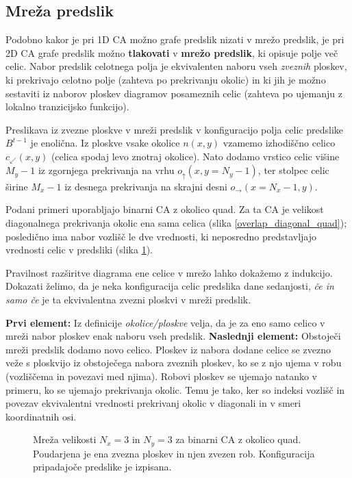 \documentclass[12pt,a4paper,openany,twoside]{book}
\begin{document}
\subsection{Mreža predslik}

Podobno kakor je pri 1D CA možno grafe predslik nizati v mrežo predslik,
je pri 2D CA grafe predslik možno \textbf{tlakovati} v \textbf{mrežo predslik},
ki opisuje polje več celic.
Nabor predslik celotnega polja je ekvivalenten naboru vseh \textit{zveznih} ploskev,
ki prekrivajo celotno polje (zahteva po prekrivanju okolic)
in ki jih je možno sestaviti iz naborov ploskev diagramov posameznih celic
(zahteva po ujemanju z lokalno tranzicijsko funkcijo).

Preslikava iz zvezne ploskve v mreži predslik v konfiguracijo polja celic predslike \(B^{t-1}\) je enolična.
Iz ploskve vsake okolice \(n(x,y)\) vzamemo izhodiščno celico
\(c_{\swarrow}(x,y)\) (celica spodaj levo znotraj okolice).
Nato dodamo vrstico celic višine \(M_y-1\) iz zgornjega prekrivanja na vrhu \(o_{\uparrow}(x,y=N_y-1)\),
ter stolpec celic širine \(M_x-1\) iz desnega prekrivanja na skrajni desni \(o_{\rightarrow}(x=N_x-1,y)\).

Podani primeri uporabljajo binarni CA z okolico quad.
Za ta CA je velikost diagonalnega prekrivanja okolic ena sama celica (slika \ref{overlap_diagonal_quad});
posledično ima nabor vozlišč le dve vrednosti, ki neposredno predstavljajo
vrednosti celic v predsliki (slika \ref{network_array}).

Pravilnost razširitve diagrama ene celice v mrežo lahko dokažemo z indukcijo.
Dokazati želimo, da je neka konfiguracija celic predslika dane sedanjosti,
\textit{če in samo če} je ta ekvivalentna zvezni ploskvi v mreži predslik.

\textbf{Prvi element:}
Iz definicije \textit{okolice/ploskve} velja,
da je za eno samo celico v mreži nabor ploskev enak naboru vseh predslik.
\textbf{Naslednji element:}
Obstoječi mreži predslik dodamo novo celico.
Ploskev iz nabora dodane celice se zvezno veže s ploskvijo
iz obstoječega nabora zveznih ploskev,
ko se z njo ujema v robu (vozliščema in povezavi med njima).
Robovi ploskev se ujemajo natanko v primeru, ko se ujemajo prekrivanja okolic.
Temu je tako, ker so indeksi vozlišč in povezav ekvivalentni
vrednosti prekrivanj okolic v diagonali in v smeri koordinatnih osi.

\begin{figure}[htb]
\centerline{}
\caption[Mreža polja celic.]{Mreža velikosti \(N_x=3\) in \(N_y=3\) za binarni CA z okolico quad.
Poudarjena je ena zvezna ploskev in njen zvezen rob. Konfiguracija pripadajoče predslike je izpisana.}
\label{network_array}
\end{figure}
\end{document}
